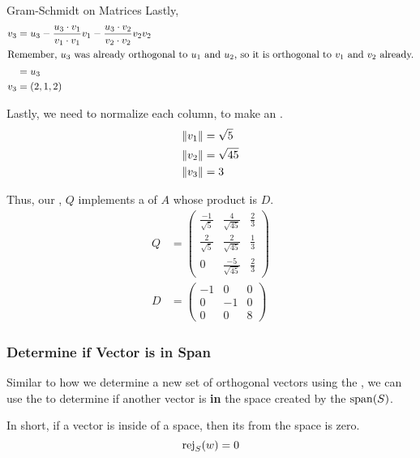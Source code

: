\begin{example}{Gram-Schmidt on Matrices}
  Lastly,
  \begin{align*}
    v_{3} &= u_{3} - \frac{u_{3} \cdot v_{1}}{v_{1} \cdot v_{1}} v_{1} - \frac{u_{3} \cdot v_{2}}{v_{2} \cdot v_{2}} v_{2} v_{2} \\
    \intertext{Remember, $u_{3}$ was already orthogonal to $u_{1}$ and $u_{2}$, so it is orthogonal to $v_{1}$ and $v_{2}$ already.}
          &= u_{3} \\
    v_{3} &= (2, 1, 2)
  \end{align*}

  Lastly, we need to normalize each column, to make an .
  \begin{align*}
    \Magnitude{v_{1}} &= \sqrt{5} \\
    \Magnitude{v_{2}} &= \sqrt{45} \\
    \Magnitude{v_{3}} &= 3
  \end{align*}

  Thus, our , $Q$ implements a  of $A$ whose product is $D$.
  \begin{align*}
    Q &=
        \begin{pmatrix}
          \frac{-1}{\sqrt{5}} & \frac{4}{\sqrt{45}} & \frac{2}{3} \\
          \frac{2}{\sqrt{5}} & \frac{2}{\sqrt{45}} & \frac{1}{3} \\
          0 & \frac{-5}{\sqrt{45}} & \frac{2}{3}
        \end{pmatrix} \\
    D &=
        \begin{pmatrix}
          -1 & 0 & 0 \\
          0 & -1 & 0 \\
          0 & 0 & 8
        \end{pmatrix}
  \end{align*}
\end{example}

\subsubsection{Determine if Vector is in Span}\label{subsubsec:Determine_Vector_In_Span}
Similar to how we determine a new set of orthogonal vectors using the , we can use the  to determine if another vector is \textbf{in} the space created by the  $\Span(S)$.

In short, if a vector is inside of a space, then its  from the space is zero.
\begin{equation*}
  \Rej{w}{S} = 0
\end{equation*}

